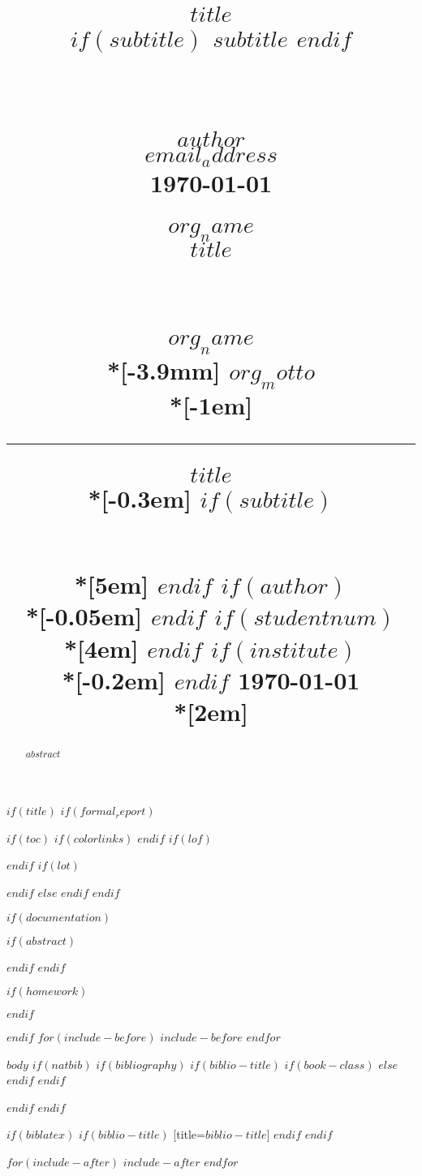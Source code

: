 \documentclass[$if(fontsize)$$fontsize$,$endif$$if(lang)$$babel-lang$,$endif$$if(papersize)$$papersize$paper,$endif$$for(classoption)$$classoption$$sep$,$endfor$]{$documentclass$}
\title{
    \normalsize
    \begin{flushright}
        \vspace{-7mm}
        \fontsize{22pt}{22pt} \color{black} \textbf{$title$} \\
        \vspace{0.3em}
        $if(subtitle)$
        \fontsize{20pt}{20pt}\color{$subtlecolor$} \textbf{$subtitle$}
        $endif$
        \vspace{-0.5em}
    \end{flushright}
    \horrule{0.4pt} \\[-0.5em]
}
\date{\vspace{-8mm}}
\title{
    \normalsize
    \begin{flushright}
        \vspace{-3em}
        \large \textbf{\textsf{$author$}} \\
        \vspace{-0.03em}
        \normalsize \textbf{\textsf{\color{$maincolor$}$email_address$}} \\
        \vspace{-0.05em}
        \textsf{\today} \\
        \vspace{1.15em}
    \end{flushright}
    \vspace{-6.0em}
    \begin{flushleft}
        \Huge \textbf{\textsf{\color{$maincolor$}$org_name$} }\\ %
        \vspace{0.07em}
        \Large \textbf{\textsf{\color{$if(grayscale)$$othercolorbw$$else$$othercolor$$endif$}$title$}} \\
        \vspace{-0.3em}
    \end{flushleft}
    \horrule{0.2pt} \\[0.5em] %
}
\date{\vspace{-4em}}
\title{
    \begin{flushright}
        \sffamily
        \vspace*{0em}
        \noindent
        \hspace{-0.40em}\YUGE 	\bfseries	\color{$if(grayscale)$$othercolorbw$$else$$othercolor$$endif$} \textbf{$org_name$} \\*[-3.9mm]
        \Yuge 		\color{black} \textbf{$org_motto$}   \\*[-1em]
        \color{black}		\hrule 		 	\vspace   	{10em}
    \end{flushright}
    \begin{flushleft}
        \sffamily
        \Subtitle  	\color{$maincolor$} \textbf{$title$}		\\*[-0.3em]
        $if(subtitle)$
        \hspace{-0.65em} \subtitle	\color{$if(grayscale)$$othercolorbw$$else$$othercolor$$endif$} \text{ $subtitle$} 	\\*[5em]
        $endif$
        $if(author)$
        \Huge	\color{black} \text{$author$}		\\*[-0.05em]
        $endif$
        $if(studentnum)$
        \LARGE	\color{$if(grayscale)$$othercolorbw$$else$$othercolor$$endif$} \text{$email_address$}	\\*[4em]
        $endif$
        $if(institute)$
        \Large	\color{black}	\text{$institute$} 	\\*[-0.2em]
        $endif$
        \Large		\color{$if(grayscale)$$othercolorbw$$else$$othercolor$$endif$}			\today				\\*[2em]
    \end{flushleft}
    }
\date{\vspace{1mm}}
\begin{document}
$if(title)$
$if(formal_report)$
\thispagestyle{title}
\maketitle
{} \vspace{-20mm}
$if(toc)$	{
$if(colorlinks)$
\hypersetup{linkcolor=$if(toccolor)$$toccolor$$else$black$endif$}
$endif$
\setcounter{tocdepth}{$toc-depth$}
\tableofcontents \vspace{15mm}
}
\thispagestyle{plain}
$if(lof)$
\listoffigures
$endif$
$if(lot)$
\listoftables	\vspace{5mm}
$endif$
\cleardoublepage
{}
\newpage
$else$
\thispagestyle{plain}
$endif$
$endif$

$if(documentation)$
\maketitle
$if(abstract)$
\begin{abstract}
$abstract$
\end{abstract}
$endif$
$endif$

$if(homework)$
\maketitle \vspace{3mm}
$endif$

$endif$
$for(include-before)$
$include-before$
$endfor$

$body$
$if(natbib)$
$if(bibliography)$
$if(biblio-title)$
$if(book-class)$
\renewcommand\bibname{$biblio-title$}
$else$
\renewcommand\refname{$biblio-title$}
$endif$
$endif$

$endif$
$endif$

$if(biblatex)$
\printbibliography
$if(biblio-title)$
[title=$biblio-title$]
$endif$
$endif$

$for(include-after)$
$include-after$
$endfor$
\end{document}
